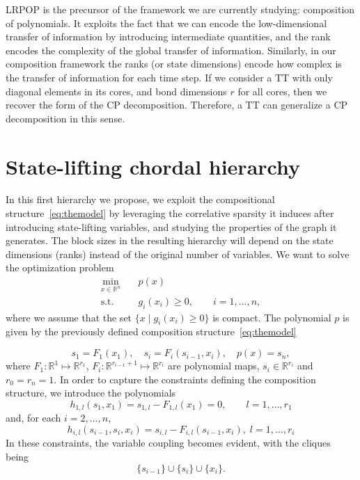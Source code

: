 \documentclass[11pt,a4paper]{article}
\newcommand{\R}{\mathbb R}
\theoremstyle{definition}
\begin{document}
LRPOP is the precursor of the framework we are currently studying: composition of polynomials. It exploits the fact that we can encode the low-dimensional transfer of information by introducing intermediate quantities, and the rank encodes the complexity of the global transfer of information. Similarly, in our composition framework the ranks (or state dimensions) encode how complex is the transfer of information for each time step. If we consider a TT with only diagonal elements in its cores, and bond dimensions $r$ for all cores, then we recover the form of the CP decomposition. Therefore, a TT can generalize a CP decomposition in this sense.





\section{State-lifting chordal hierarchy}\label{sec:chordal}

In this first hierarchy we propose, we exploit the compositional structure~\eqref{eq:themodel} by leveraging the correlative sparsity it induces after introducing state-lifting variables, and studying the properties of the graph it generates. The block sizes in the resulting hierarchy will depend on the state dimensions (ranks) instead of the original number of variables. We want to solve the optimization problem
\begin{equation}
\begin{aligned}
\min_{x\in\mathbb{R}^n} \quad & p(x) \\
\text{s.t.}\quad & g_i(x_i)\ge0, \qquad i=1,\dots,n,
\label{eq:pop_sparse}
\end{aligned}
\end{equation}
where we assume that the set  $\{x \mid g_i(x_i) \ge 0\}$ is compact. The polynomial $p$ is given by the previously defined composition structure~\eqref{eq:themodel}

\[
s_{1} =F_1(x_1), \quad  s_i  = F_i(s_{i-1},x_i), \quad p(x)=s_n,
\]
where $F_1:\R^1\mapsto \R^{r_1}$, $F_i:\R^{r_{i-1}+1}\mapsto \R^{r_i}$ are polynomial maps, $s_i\in \R^{r_i}$ and $r_0=r_n=1$. In order to capture the  constraints defining the composition structure, we introduce the polynomials \[
h_{1,l}(s_{1},x_1)=s_{1,l}-F_{1,l}(x_1)=0, \qquad l=1,\dots,r_1
\]
and, for each $i = 2,\ldots,n$,
\[
h_{i,l}(s_{i-1},s_{i},x_i)=s_{i,l}-F_{i,l}(s_{i-1},x_i), \; l=1,\ldots,r_i
\] In these constraints, the variable coupling becomes evident, with the cliques being 
\[
\{s_{i-1}\}\cup \{s_i\}\cup\{x_i\}.
\]
\end{document}
